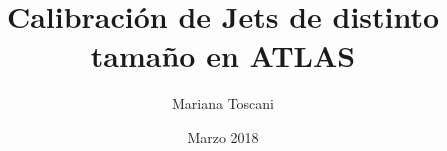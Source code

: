 \documentclass{masterthesis}
\title{Calibración de Jets de distinto tamaño en ATLAS}
\author{Mariana Toscani}
\date{Marzo 2018}
\begin{document}
\maketitle
\makefrontmatter













\clearpage

\makebibliography


\begin{comment}
\begin{appendices}

\end{appendices}
\end{comment}
\end{document}
